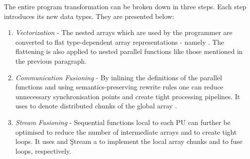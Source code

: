     The entire program transformation can be broken down in three steps.
    Each step introduces its new data types. They are presented below:
    \begin{enumerate}
      \item \emph{Vectorization} -
        The nested arrays \pan{} which are used by the programmer
        are converted to flat type-dependent array representations - namely  \pav{}.
        The flattening is also applied to nested parallel functions like
        those mentioned in the previous paragraph.
      \item \emph{Communication Fusioning} -
        By inlining the definitions of the parallel functions and
        using semantics-preserving rewrite rules one can
        reduce unnecessary synchronisation points and
        create tight processing pipelines. It uses \pad{} to denote
        distributed chunks of the global array \pav{}.
      \item \emph{Stream Fusioning} -
        Sequential functions local to each PU can further
        be optimised to reduce the number of intermediate arrays
        and to create tight loops.
        It uses  and \c{Stream a} to
        implement the local array chunks and to fuse loops, respectively.
    \end{enumerate}
    
